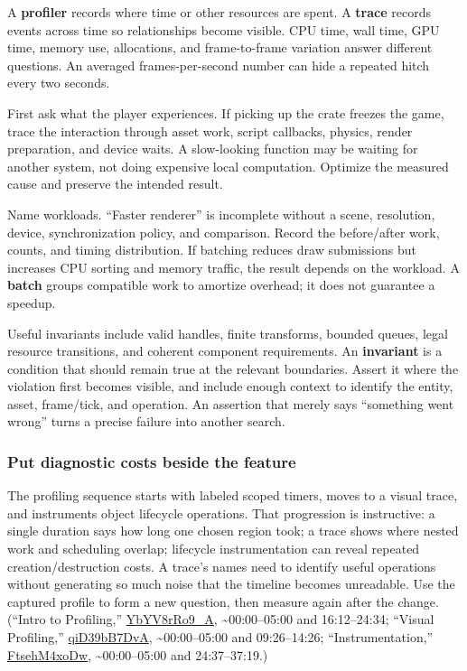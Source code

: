A \textbf{profiler} records where time or other resources are spent. A \textbf{trace} records events across time so relationships become visible. CPU time, wall time, GPU time, memory use, allocations, and frame-to-frame variation answer different questions. An averaged frames-per-second number can hide a repeated hitch every two seconds.

First ask what the player experiences. If picking up the crate freezes the game, trace the interaction through asset work, script callbacks, physics, render preparation, and device waits. A slow-looking function may be waiting for another system, not doing expensive local computation. Optimize the measured cause and preserve the intended result.

Name workloads. ``Faster renderer'' is incomplete without a scene, resolution, device, synchronization policy, and comparison. Record the before/after work, counts, and timing distribution. If batching reduces draw submissions but increases CPU sorting and memory traffic, the result depends on the workload. A \textbf{batch} groups compatible work to amortize overhead; it does not guarantee a speedup.

Useful invariants include valid handles, finite transforms, bounded queues, legal resource transitions, and coherent component requirements. An \textbf{invariant} is a condition that should remain true at the relevant boundaries. Assert it where the violation first becomes visible, and include enough context to identify the entity, asset, frame/tick, and operation. An assertion that merely says ``something went wrong'' turns a precise failure into another search.

\subsubsection{Put diagnostic costs beside the feature}\label{put-diagnostic-costs-beside-the-feature}

The profiling sequence starts with labeled scoped timers, moves to a visual trace, and instruments object lifecycle operations. That progression is instructive: a single duration says how long one chosen region took; a trace shows where nested work and scheduling overlap; lifecycle instrumentation can reveal repeated creation/destruction costs. A trace's names need to identify useful operations without generating so much noise that the timeline becomes unreadable. Use the captured profile to form a new question, then measure again after the change. (``Intro to Profiling,'' \href{https://www.youtube.com/watch?v=YbYV8rRo9_A}{YbYV8rRo9\_A}, \textasciitilde00:00--05:00 and 16:12--24:34; ``Visual Profiling,'' \href{https://www.youtube.com/watch?v=qiD39bB7DvA}{qiD39bB7DvA}, \textasciitilde00:00--05:00 and 09:26--14:26; ``Instrumentation,'' \href{https://www.youtube.com/watch?v=FtsehM4xoDw}{FtsehM4xoDw}, \textasciitilde00:00--05:00 and 24:37--37:19.)

